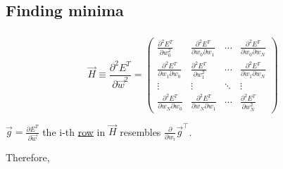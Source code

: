 \subsection{Finding minima}

\begin{frame}\frametitle{\subsecname}
\begin{equation}
\vec{H} \equiv \frac{\partial^2 E^T}{\partial\vec{w}^2} =
\left(\begin{array}{cccc}  
  \frac{\partial^2 E^T}{\partial w_0^2} &
  \frac{\partial^2 E^T}{\partial w_0\partial w_1} & \cdots &
  \frac{\partial^2 E^T}{\partial w_0\partial w_N} \\
  \frac{\partial^2 E^T}{\partial w_1\partial w_0} &
  \frac{\partial^2 E^T}{\partial w_1^2} & \cdots &
  \frac{\partial^2 E^T}{\partial w_1\partial w_N} \\
  \vdots & \vdots & \ddots & \vdots \\
  \frac{\partial^2 E^T}{\partial w_N\partial w_0} &
  \frac{\partial^2 E^T}{\partial w_N\partial w_1} & \cdots &
  \frac{\partial^2 E^T}{\partial w_N^2}
\end{array}\right)
\end{equation}

 $\vec g = \frac{\partial E^{T}}{\partial \vec w}$ 
\pause
{}the i-th \underline{row} in $\vec H$ resembles $\frac{\partial}{\partial w_i}\vec g^\top$.

Therefore,

\end{frame}

